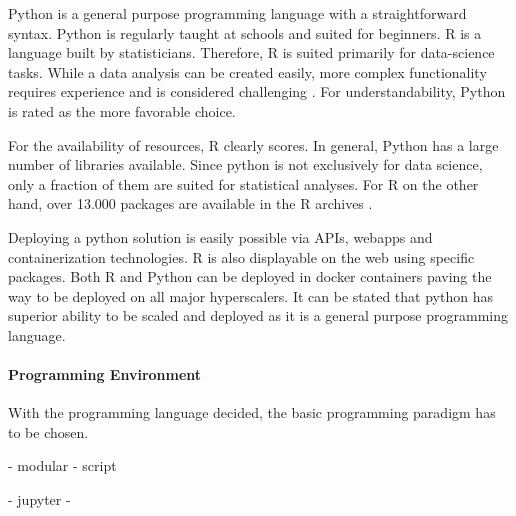 Python is a general purpose programming language with a straightforward syntax. Python is regularly taught at schools and suited for beginners. R is a language built by statisticians. Therefore, R is suited primarily for data-science tasks. While a data analysis can be created easily, more complex functionality requires experience and is considered challenging \cite{pythonVsR}. For understandability, Python is rated as the more favorable choice.

For the availability of resources, R clearly scores. In general, Python has a large number of libraries available. Since python is not exclusively for data science, only a fraction of them are suited for statistical analyses. For R on the other hand, over 13.000 packages are available in the R archives \cite{pythonVsR}.

Deploying a python solution is easily possible via APIs, webapps and containerization technologies. R is also displayable on the web using specific packages. Both R and Python can be deployed in docker containers \cite{rDocker} \cite{pythonDocker} paving the way to be deployed on all major hyperscalers.
It can be stated that python has superior ability to be scaled and deployed as it is a general purpose programming language. 

\paragraph{Programming Environment}
With the programming language decided, the basic programming paradigm has to be chosen.


- modular
- script

- jupyter
- 












